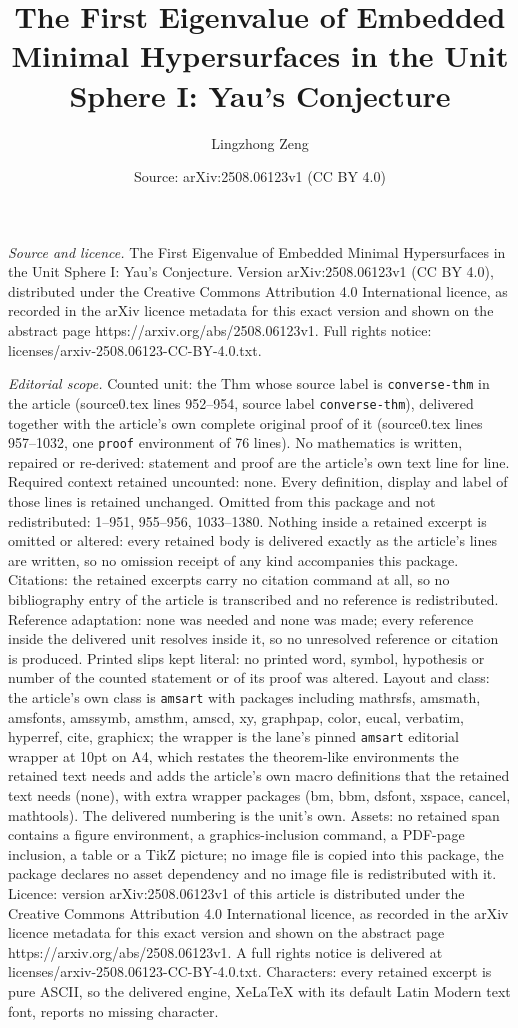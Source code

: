 \documentclass[10pt,a4paper]{amsart}
\title[The First Eigenvalue of Embedded Minimal Hypersurfaces in th]{The First Eigenvalue of Embedded Minimal Hypersurfaces in the Unit Sphere I: Yau's Conjecture}
\author{Lingzhong Zeng}
\date{Source: arXiv:2508.06123v1 (CC BY 4.0)}
\begin{document}
\maketitle

\noindent\emph{Source and licence.} The First Eigenvalue of Embedded Minimal Hypersurfaces in the Unit Sphere I: Yau's Conjecture. Version arXiv:2508.06123v1 (CC BY 4.0), distributed under the Creative Commons Attribution 4.0 International licence, as recorded in the arXiv licence metadata for this exact version and shown on the abstract page https://arxiv.org/abs/2508.06123v1. Full rights notice: licenses/arxiv-2508.06123-CC-BY-4.0.txt.\par\smallskip

\noindent\textit{Editorial scope.} Counted unit: the Thm whose source label is \texttt{converse-thm} in the article (source0.tex lines 952--954, source label \texttt{converse-thm}), delivered together with the article's own complete original proof of it (source0.tex lines 957--1032, one \texttt{proof} environment of 76 lines). No mathematics is written, repaired or re-derived: statement and proof are the article's own text line for line. Required context retained uncounted: none. Every definition, display and label of those lines is retained unchanged. Omitted from this package and not redistributed: 1--951, 955--956, 1033--1380. Nothing inside a retained excerpt is omitted or altered: every retained body is delivered exactly as the article's lines are written, so no omission receipt of any kind accompanies this package. Citations: the retained excerpts carry no citation command at all, so no bibliography entry of the article is transcribed and no reference is redistributed. Reference adaptation: none was needed and none was made; every reference inside the delivered unit resolves inside it, so no unresolved reference or citation is produced. Printed slips kept literal: no printed word, symbol, hypothesis or number of the counted statement or of its proof was altered. Layout and class: the article's own class is \texttt{amsart} with packages including mathrsfs, amsmath, amsfonts, amssymb, amsthm, amscd, xy, graphpap, color, eucal, verbatim, hyperref, cite, graphicx; the wrapper is the lane's pinned \texttt{amsart} editorial wrapper at 10pt on A4, which restates the theorem-like environments the retained text needs and adds the article's own macro definitions that the retained text needs (none), with extra wrapper packages (bm, bbm, dsfont, xspace, cancel, mathtools). The delivered numbering is the unit's own. Assets: no retained span contains a figure environment, a graphics-inclusion command, a PDF-page inclusion, a table or a TikZ picture; no image file is copied into this package, the package declares no asset dependency and no image file is redistributed with it. Licence: version arXiv:2508.06123v1 of this article is distributed under the Creative Commons Attribution 4.0 International licence, as recorded in the arXiv licence metadata for this exact version and shown on the abstract page https://arxiv.org/abs/2508.06123v1. A full rights notice is delivered at licenses/arxiv-2508.06123-CC-BY-4.0.txt. Characters: every retained excerpt is pure ASCII, so the delivered engine, XeLaTeX with its default Latin Modern text font, reports no missing character.
\end{document}
